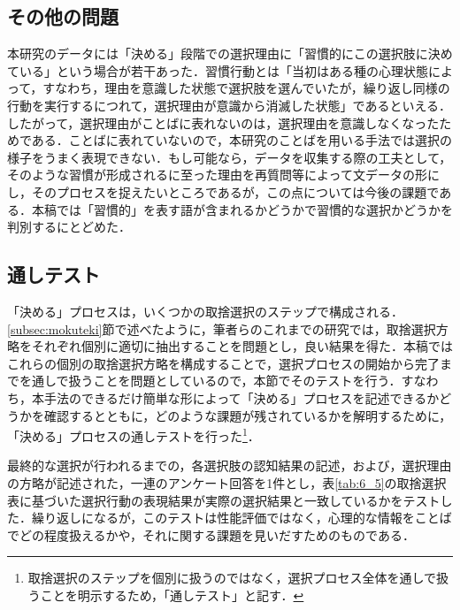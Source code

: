 \documentclass[japanese]{jnlp_1.3a}
\begin{document}
\subsection{その他の問題}

本研究のデータには「決める」段階での選択理由に「習慣的にこの選択肢に決めている」という場合が若干あった．習慣行動とは「当初はある種の心理状態によって，すなわち，理由を意識した状態で選択肢を選んでいたが，繰り返し同様の行動を実行するにつれて，選択理由が意識から消滅した状態」であるといえる\cite{Fujii2002}．したがって，選択理由がことばに表れないのは，選択理由を意識しなくなったためである．ことばに表れていないので，本研究のことばを用いる手法では選択の様子をうまく表現できない．もし可能なら，データを収集する際の工夫として，そのような習慣が形成されるに至った理由を再質問等によって文データの形にし，そのプロセスを捉えたいところであるが，この点については今後の課題である．本稿では「習慣的」を表す語が含まれるかどうかで習慣的な選択かどうかを判別するにとどめた．

\subsection{通しテスト}

「決める」プロセスは，いくつかの取捨選択のステップで構成される．\ref{subsec:mokuteki}節で述べたように，筆者らのこれまでの研究では，取捨選択方略をそれぞれ個別に適切に抽出することを問題とし，良い結果を得た．本稿ではこれらの個別の取捨選択方略を構成することで，選択プロセスの開始から完了までを通しで扱うことを問題としているので，本節でそのテストを行う．すなわち，本手法のできるだけ簡単な形によって「決める」プロセスを記述できるかどうかを確認するとともに，どのような課題が残されているかを解明するために，「決める」プロセスの通しテストを行った\footnote{取捨選択のステップを個別に扱うのではなく，選択プロセス全体を通しで扱うことを明示するため，「通しテスト」と記す．}．

最終的な選択が行われるまでの，各選択肢の認知結果の記述，および，選択理由の方略が記述された，一連のアンケート回答を1件とし，表\ref{tab:6_5}の取捨選択表に基づいた選択行動の表現結果が実際の選択結果と一致しているかをテストした．繰り返しになるが，このテストは性能評価ではなく，心理的な情報をことばでどの程度扱えるかや，それに関する課題を見いだすためのものである．
\end{document}
